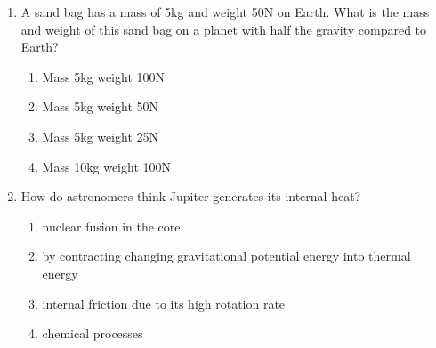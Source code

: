 \documentclass[12pt]{article}
\begin{document}
\begin{enumerate}[label=\arabic*.]
\begin{enumerate}[label=(\alph*)]
    \item Power emitted is 1/16 times as high; peak emission wavelength is 1/2 as long.
    \item Power emitted is 1/4 times as high; peak emission wavelength is 2 times longer.
    \item Power emitted is 1/4 times as high; peak emission wavelength is 1/2 as long.
    \item Power emitted is 1/16 times as high; peak emission wavelength is 2 times longer.
\end{enumerate}
\item A sand bag has a mass of 5kg and weight 50N on Earth. What is the mass and weight of this
sand bag on a planet with half the gravity compared to Earth?
\begin{enumerate}[label=(\alph*)]
    \item Mass 5kg weight 100N
    \item Mass 5kg weight 50N
    \item Mass 5kg weight 25N
    \item Mass 10kg weight 100N
\end{enumerate}
\item How do astronomers think Jupiter generates its internal heat?
\begin{enumerate}[label=(\alph*)]
    \item nuclear fusion in the core
    \item by contracting changing gravitational potential energy into thermal energy
    \item internal friction due to its high rotation rate
    \item chemical processes
\end{enumerate}
\end{enumerate}
\end{document}
